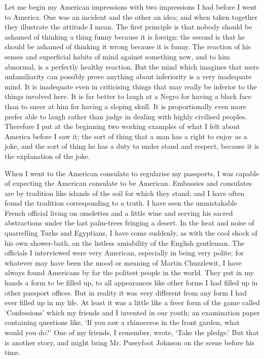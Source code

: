 \documentclass{book}
\begin{document}
Let me begin my American impressions with two impressions I had before I went to America. One was an incident and the other an idea; and when taken together they illustrate the attitude I mean. The first principle is that nobody should be ashamed of thinking a thing funny because it is foreign; the second is that he should be ashamed of thinking it wrong because it is funny. The reaction of his senses and superficial habits of mind against something new, and to him abnormal, is a perfectly healthy reaction. But the mind which imagines that mere unfamiliarity can possibly prove anything about inferiority is a very inadequate mind. It is inadequate even in criticising things that may really be inferior to the things involved here. It is far better to laugh at a Negro for having a black face than to sneer at him for having a sloping skull. It is proportionally even more prefer able to laugh rather than judge in dealing with highly civilised peoples. Therefore I put at the beginning two working examples of what I felt about America before I saw it; the sort of thing that a man has a right to enjoy as a joke, and the sort of thing he has a duty to under stand and respect, because it is the explanation of the joke.

When I went to the American consulate to regularise my passports, I was capable of expecting the American consulate to be American. Embassies and consulates are by tradition like islands of the soil for which they stand; and I have often found the tradition corresponding to a truth. I have seen the unmistakable French official living on omelettes and a little wine and serving his sacred abstractions under the last palm-trees fringing a desert. In the heat and noise of quarrelling Turks and Egyptians, I have come suddenly, as with the cool shock of his own shower-bath, on the listless amiability of the English gentleman. The officials I interviewed were very American, especially in being very polite; for whatever may have been the mood or meaning of Martin Chuzzlewit, I have always found Americans by far the politest people in the world. They put in my hands a form to be filled up, to all appearances like other forms I had filled up in other passport offices. But in reality it was very different from any form I had ever filled up in my life. At least it was a little like a freer form of the game called ‘Confessions’ which my friends and I invented in our youth; an examination paper containing questions like, ‘If you saw a rhinoceros in the front garden, what would you do?’ One of my friends, I remember, wrote, ‘Take the pledge.’ But that is another story, and might bring Mr. Pussyfoot Johnson on the scene before his time.
\end{document}
